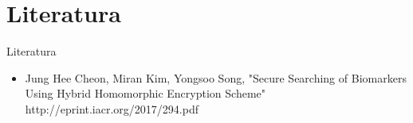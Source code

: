 \documentclass[10pt]{beamer}
\begin{document}
  

\section{Literatura}
\begin{frame}{Literatura}
\begin{itemize}
\item Jung Hee Cheon, Miran Kim, Yongsoo Song, "Secure Searching of Biomarkers Using Hybrid Homomorphic Encryption Scheme"\\ http://eprint.iacr.org/2017/294.pdf
\end{itemize}

\end{frame}


{\1
\begin{frame}
\end{frame}}
\end{document}
